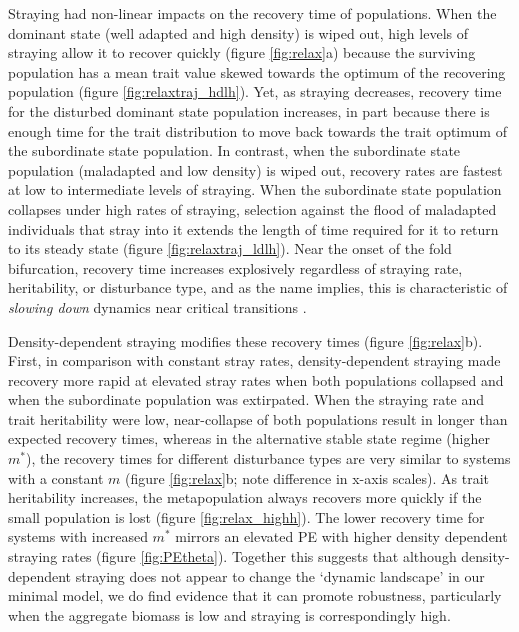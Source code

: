 \documentclass[twocolumn,preprintnumbers,amsmath,amssymb,superscriptaddress]{revtex4}
\begin{document}
Straying had non-linear impacts on the recovery time of populations. 
When the dominant state (well adapted and high density) is wiped out, high levels of straying allow it to recover quickly (figure \ref{fig:relax}a) because the surviving population has a mean trait value skewed towards the optimum of the recovering population (figure \ref{fig:relaxtraj_hdlh}).
Yet, as straying decreases, recovery time for the disturbed dominant state population increases, in part because there is enough time for the trait distribution to move back towards the trait optimum of the subordinate state population.
In contrast, when the subordinate state population (maladapted and low density) is wiped out, recovery rates are fastest at low to intermediate levels of straying.
When the subordinate state population collapses under high rates of straying, selection against the flood of maladapted individuals that stray into it extends the length of time required for it to return to its steady state (figure \ref{fig:relaxtraj_ldlh}).
Near the onset of the fold bifurcation, recovery time increases explosively regardless of straying rate, heritability, or disturbance type, and as the name implies, this is characteristic of \emph{slowing down} dynamics near critical transitions \cite{Kuehn:2010p2591}.

Density-dependent straying modifies these recovery times (figure \ref{fig:relax}b). 
First, in comparison with constant stray rates, density-dependent straying made recovery more rapid at elevated stray rates when both populations collapsed and when the subordinate population was extirpated.
When the straying rate and trait heritability were low, near-collapse of both populations result in longer than expected recovery times, whereas in the alternative stable state regime (higher $m^*$), the recovery times for different disturbance types are very similar to systems with a constant $m$ (figure \ref{fig:relax}b; note difference in x-axis scales).
As trait heritability increases, the metapopulation always recovers more quickly if the small population is lost (figure \ref{fig:relax_highh}).
The lower recovery time for systems with increased $m^*$ mirrors an elevated PE with higher density dependent straying rates (figure \ref{fig:PEtheta}).
Together this suggests that although density-dependent straying does not appear to change the `dynamic landscape' in our minimal model, we do find evidence that it can promote robustness, particularly when the aggregate biomass is low and straying is correspondingly high.
\end{document}
